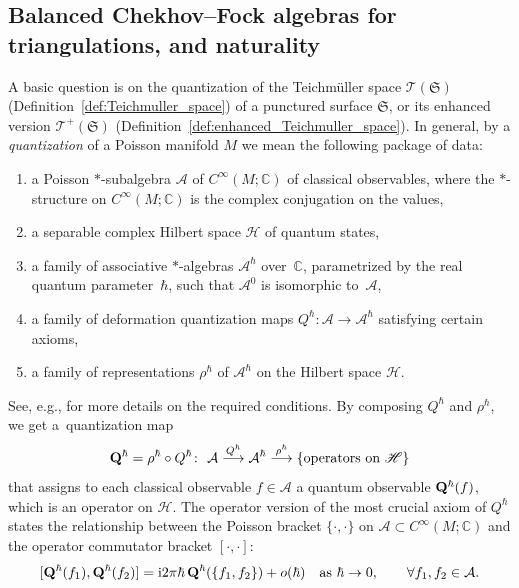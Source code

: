\documentclass[10pt,a4paper]{amsart}
\numberwithin{equation}{section}
\theoremstyle{definition}
\begin{document}
\subsection{Balanced Chekhov--Fock algebras for triangulations, and naturality}
\label{subsec:balanced_algebras}
A basic question is on the quantization of the Teichm\"uller space $\mathscr{T}(\mathfrak{S})$ (Definition~\ref{def:Teichmuller_space}) of a punctured surface $\mathfrak{S}$, or its enhanced version $\mathscr{T}^+(\mathfrak{S})$ (Definition~\ref{def:enhanced_Teichmuller_space}). In general, by a {\em quantization} of a Poisson manifold $M$ we mean the following package of data:
\begin{enumerate}[label={\rm (Q\arabic*)}]\itemsep=0pt
\item\label{Q1} a Poisson $*$-subalgebra $\mathcal{A}$ of $C^\infty(M;\mathbb{C})$ of classical observables, where the $*$-structure on $C^\infty(M;\mathbb{C})$ is the complex conjugation on the values,
\item a separable complex Hilbert space $\mathscr{H}$ of quantum states,
\item a family of associative $*$-algebras $\mathcal{A}^\hbar$ over~$\mathbb{C}$, parametrized by the real quantum parameter~$\hbar$, such that $\mathcal{A}^0$ is isomorphic to~$\mathcal{A}$,
\item\label{Q4} a family of deformation quantization maps $Q^\hbar \colon \mathcal{A} \to \mathcal{A}^\hbar$ satisfying certain axioms,
\item\label{Q5} a family of representations $\rho^\hbar$ of $\mathcal{A}^\hbar$ on the Hilbert space $\mathscr{H}$.
\end{enumerate}
See, e.g., \cite{KS} for more details on the required conditions. By composing $Q^\hbar$ and $\rho^\hbar$, we get a~quantization map
\[
{\bf Q}^\hbar = \rho^\hbar \circ Q^\hbar \colon \ \mathcal{A} \stackrel{Q^\hbar}{\longrightarrow} \mathcal{A}^\hbar \stackrel{\rho^\hbar}{\longrightarrow} \{\mbox{operators on $\mathscr{H}$}\}
\]
that assigns to each classical observable $f\in \mathcal{A}$ a quantum observable ${\bf Q}^\hbar(f)$, which is an operator on $\mathscr{H}$. The operator version of the most crucial axiom of $Q^\hbar$ states the relationship between the Poisson bracket $\{\cdot,\cdot\}$ on $\mathcal{A}\subset C^\infty(M;\mathbb{C})$ and the operator commutator bracket $[\cdot,\cdot]$:
\[
[{\bf Q}^\hbar(f_1), {\bf Q}^\hbar(f_2)] = {\rm i} 2\pi \hbar \, {\bf Q}^\hbar(\{f_1,f_2\}) + o(\hbar) \quad \mbox{as $\hbar \to 0$}, \qquad \forall f_1,f_2 \in \mathcal{A}.
\]
\end{document}
